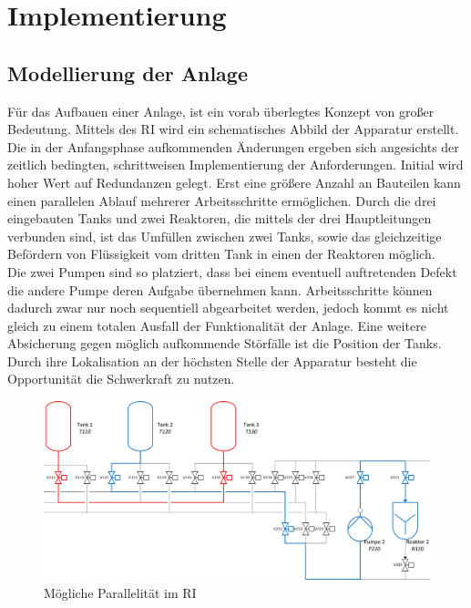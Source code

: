 \chapter{Implementierung} \label{chapter:thevetestcase}
\section{Modellierung der Anlage}
Für das Aufbauen einer Anlage, ist ein vorab überlegtes Konzept von großer Bedeutung. Mittels des \ac{RI} wird ein schematisches Abbild der Apparatur erstellt. Die in der Anfangsphase aufkommenden Änderungen ergeben sich angesichts der zeitlich bedingten, schrittweisen Implementierung der Anforderungen. Initial wird hoher Wert auf Redundanzen gelegt. Erst eine größere Anzahl an Bauteilen kann einen parallelen Ablauf mehrerer Arbeitsschritte ermöglichen. Durch die drei eingebauten Tanks und zwei Reaktoren, die mittels der drei Hauptleitungen verbunden sind, ist das Umfüllen zwischen zwei Tanks, sowie das gleichzeitige Befördern von Flüssigkeit vom dritten Tank in einen der Reaktoren möglich.\\

Die zwei Pumpen sind so platziert, dass bei einem eventuell auftretenden Defekt die andere Pumpe deren Aufgabe übernehmen kann. Arbeitsschritte können dadurch zwar nur noch sequentiell abgearbeitet werden, jedoch kommt es nicht gleich zu einem totalen Ausfall der Funktionalität der Anlage. Eine weitere Absicherung gegen möglich aufkommende Störfälle ist die Position der Tanks. Durch ihre Lokalisation an der höchsten Stelle der Apparatur besteht die Opportunität die Schwerkraft zu nutzen.\\

\begin{figure}[h!]
  \centering
  \includegraphics[width=1\textwidth]{graphics/implementation/RI_Impl_cropped.jpg}
  \caption{Mögliche Parallelität im \ac{RI}}
\end{figure}

